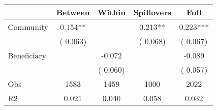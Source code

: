 
\begin{tabular}{l*{4}{c}}\hline&\multicolumn{1}{c}{Between}&\multicolumn{1}{c}{Within}&\multicolumn{1}{c}{Spillovers}&\multicolumn{1}{c}{Full}\\ \hline
 Community             &              0.154**      &                                               &        0.213** &         0.223***                            \\ 
                               &        (       0.063)           &                                       &       (       0.068)     &      (       0.067)                                           \\ 
 Beneficiary   &                                               &       -0.072    &                                &            -0.089                            \\ 
                               &                                               & (       0.060)                  &                                        &      (       0.057)                                           \\ 
\hline                                                                                                                                                                                                                                            
 Obs                   &               1583               &       1459                       &       1000                &              2022                                               \\ 
 R2                    &                      0.021              &              0.040                      &              0.058               &                     0.032                                              \\ 
\hline \end{tabular}                                                                                                                                                                                                              
